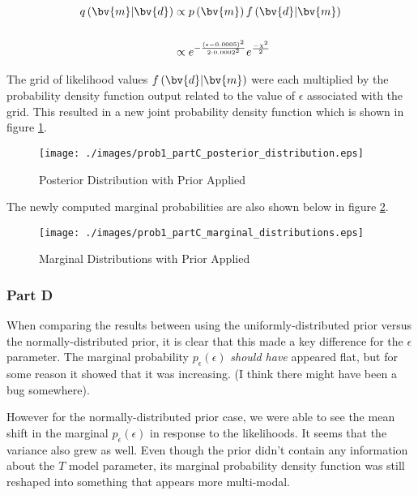 \begin{align*}
	q\left(\bv{m}|\bv{d}\right) &\propto p\left(\bv{m}\right) f\left(\bv{d}|\bv{m}\right) \\
	\\
	&\propto e^{-\frac{\left(\epsilon - 0.0005\right)^2}{2 \cdot 0.0002^2}} e^{\frac{-\chi^2}{2}}
\end{align*}

The grid of likelihood values $f\left(\bv{d}|\bv{m}\right)$ were each multiplied by the probability density function output related to the value of $\epsilon$ associated with the grid. This resulted in a new joint probability density function which is shown in figure \ref{fig: prob1 partC posterior distribution}.

\begin{figure}[h] 
	\centering
	\texttt{[image: ./images/prob1\_partC\_posterior\_distribution.eps]}
	\caption{Posterior Distribution with Prior Applied}
	\label{fig: prob1 partC posterior distribution}
\end{figure}
\FloatBarrier

The newly computed marginal probabilities are also shown below in figure \ref{fig: prob1 partC marginal distributions}.

\begin{figure}[h] 
	\centering
	\texttt{[image: ./images/prob1\_partC\_marginal\_distributions.eps]}
	\caption{Marginal Distributions with Prior Applied}
	\label{fig: prob1 partC marginal distributions}
\end{figure}
\FloatBarrier


\subsubsection{Part D}

When comparing the results between using the uniformly-distributed prior versus the normally-distributed prior, it is clear that this made a key difference for the $\epsilon$ parameter. The marginal probability $p_\epsilon\left(\epsilon\right)$ \textit{should have} appeared flat, but for some reason it showed that it was increasing. (I think there might have been a bug somewhere). 

However for the normally-distributed prior case, we were able to see the mean shift in the marginal $p_\epsilon\left(\epsilon\right)$ in response to the likelihoods. It seems that the variance also grew as well. Even though the prior didn't contain any information about the $T$ model parameter, its marginal probability density function was still reshaped into something that appears more multi-modal. 

